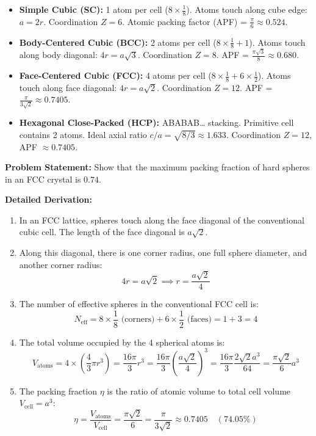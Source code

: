\documentclass[11pt,a4paper]{article}
\begin{document}
\begin{itemize}[leftmargin=1.5em]
    \item \textbf{Simple Cubic (SC):} 1 atom per cell ($8 \times \frac{1}{8}$). Atoms touch along cube edge: $a = 2r$. Coordination $Z = 6$. Atomic packing factor (APF) = $\frac{\pi}{6} \approx 0.524$.
    \item \textbf{Body-Centered Cubic (BCC):} 2 atoms per cell ($8 \times \frac{1}{8} + 1$). Atoms touch along body diagonal: $4r = a\sqrt{3}$. Coordination $Z = 8$. APF = $\frac{\pi\sqrt{3}}{8} \approx 0.680$.
    \item \textbf{Face-Centered Cubic (FCC):} 4 atoms per cell ($8 \times \frac{1}{8} + 6 \times \frac{1}{2}$). Atoms touch along face diagonal: $4r = a\sqrt{2}$. Coordination $Z = 12$. APF = $\frac{\pi}{3\sqrt{2}} \approx 0.7405$.
    \item \textbf{Hexagonal Close-Packed (HCP):} ABABAB\ldots{} stacking. Primitive cell contains 2 atoms. Ideal axial ratio $c/a = \sqrt{8/3} \approx 1.633$. Coordination $Z = 12$, APF $\approx 0.7405$.
\end{itemize}

\begin{solbox}
\textbf{Problem Statement:} Show that the maximum packing fraction of hard spheres in an FCC crystal is $0.74$.

\textbf{Detailed Derivation:}
\begin{enumerate}
    \item In an FCC lattice, spheres touch along the face diagonal of the conventional cubic cell. The length of the face diagonal is $a\sqrt{2}$.
    \item Along this diagonal, there is one corner radius, one full sphere diameter, and another corner radius:
    \begin{equation}
    4r = a\sqrt{2} \implies r = \frac{a\sqrt{2}}{4}
    \end{equation}
    \item The number of effective spheres in the conventional FCC cell is:
    \begin{equation}
    N_{\text{eff}} = 8 \times \frac{1}{8} \text{ (corners)} + 6 \times \frac{1}{2} \text{ (faces)} = 1 + 3 = 4
    \end{equation}
    \item The total volume occupied by the 4 spherical atoms is:
    \begin{equation}
    V_{\text{atoms}} = 4 \times \left(\frac{4}{3}\pi r^3\right) = \frac{16\pi}{3} r^3 = \frac{16\pi}{3}\left(\frac{a\sqrt{2}}{4}\right)^3 = \frac{16\pi}{3} \frac{2\sqrt{2}a^3}{64} = \frac{\pi\sqrt{2}}{6} a^3
    \end{equation}
    \item The packing fraction $\eta$ is the ratio of atomic volume to total cell volume $V_{\text{cell}} = a^3$:
    \begin{equation}
    \eta = \frac{V_{\text{atoms}}}{V_{\text{cell}}} = \frac{\pi\sqrt{2}}{6} = \frac{\pi}{3\sqrt{2}} \approx \mathbf{0.7405 \quad (74.05\%)}
    \end{equation}
\end{enumerate}
\end{solbox}
\end{document}
